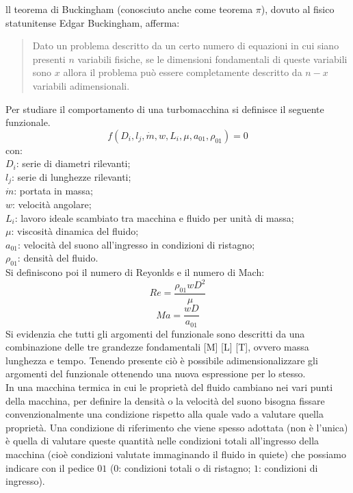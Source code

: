 ll teorema di Buckingham (conosciuto anche come teorema $\pi$), dovuto al fisico statunitense Edgar Buckingham, afferma:
\begin{quotation}
	Dato un problema descritto da un certo numero di equazioni in cui siano presenti $n$ variabili fisiche, se le dimensioni fondamentali di queste variabili sono $x$ allora il problema può essere completamente descritto da $n - x$ variabili adimensionali.
\end{quotation}
Per studiare il comportamento di una turbomacchina si definisce il seguente funzionale.
\begin{equation}
f(D_i,l_j,\dot{m},w,L_i,\mu,a_{01},\rho_{01})=0
\end{equation}
con:\\[1mm]
$D_i$: serie di diametri rilevanti;\\
$l_j$: serie di lunghezze rilevanti;\\
$\dot{m}$: portata in massa;\\
$w$: velocità angolare;\\
$L_i$: lavoro ideale scambiato tra macchina e fluido per unità di massa;\\
$\mu$: viscosità dinamica del fluido;\\
$a_{01}$: velocità del suono all'ingresso in condizioni di ristagno;\\
$\rho_{01}$: densità del fluido.\\[2mm]
Si definiscono poi il numero di Reyonlds e il numero di Mach:
\begin{equation}
Re= \frac{\rho_{01} w D^2}{\mu}
\end{equation}
\begin{equation}
Ma= \frac{w D}{a_{01}}
\end{equation}
Si evidenzia che tutti gli argomenti del funzionale sono descritti da una combinazione delle tre grandezze fondamentali [M] [L] [T], ovvero massa lunghezza e tempo. Tenendo presente ciò è possibile adimensionalizzare gli argomenti del funzionale ottenendo una nuova espressione per lo stesso.\\
In una macchina termica in cui le proprietà del fluido cambiano nei vari punti della macchina, per definire la densità o la velocità del suono bisogna fissare convenzionalmente una condizione rispetto alla quale vado a valutare quella proprietà.
Una condizione di riferimento che viene spesso adottata (non è l’unica) è quella di valutare queste quantità nelle condizioni totali all’ingresso della macchina (cioè condizioni valutate immaginando il fluido in quiete) che possiamo indicare con il pedice $01$ ($0$: condizioni totali o di ristagno; $1$: condizioni di ingresso).\\
